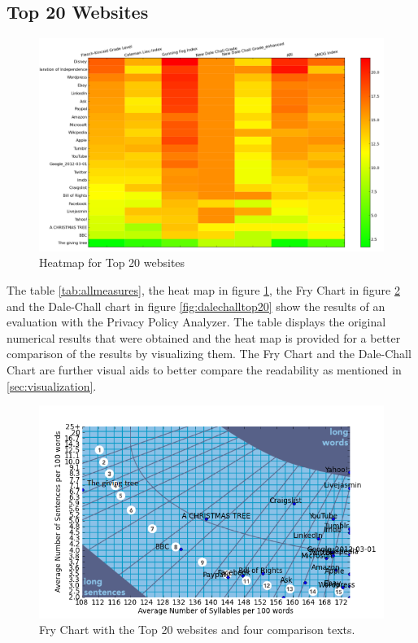 \documentclass[runningheads,a4paper]{llncs}
\begin{document}
\subsection{Top 20 Websites}
\begin{figure}
\centering
\includegraphics[width=\textwidth]{Bilder/heatmap_alex20_kl.png}
\caption{Heatmap for Top 20 websites}
\label{fig:heatmap}
\end{figure}

The table \ref{tab:allmeasures}, the heat map in figure \ref{fig:heatmap}, the Fry Chart in figure \ref{fig:frytop20} and the Dale-Chall chart in figure \ref{fig:dalechalltop20} show the results of an evaluation with the Privacy Policy Analyzer. The table displays the original numerical results that were obtained and the heat map is provided for a better comparison of the results by visualizing them. The Fry Chart and the Dale-Chall Chart are further visual aids to better compare the readability as mentioned in \ref{sec:visualization}.


\begin{figure}
\centering
\includegraphics[width=\textwidth]{Bilder/fry_chart_alex20.png}
\caption{Fry Chart with the Top 20 websites and four comparison texts.}
\label{fig:frytop20}
\end{figure}
\end{document}
